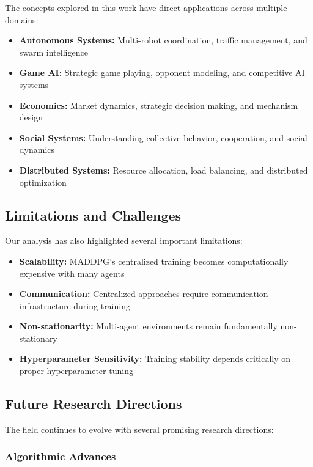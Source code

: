 \documentclass[conference]{IEEEtran}
\begin{document}
{{The concepts explored in this work have direct applications across multiple domains:

\begin{itemize}
    \item \textbf{Autonomous Systems:} Multi-robot coordination, traffic management, and swarm intelligence
    \item \textbf{Game AI:} Strategic game playing, opponent modeling, and competitive AI systems
    \item \textbf{Economics:} Market dynamics, strategic decision making, and mechanism design
    \item \textbf{Social Systems:} Understanding collective behavior, cooperation, and social dynamics
    \item \textbf{Distributed Systems:} Resource allocation, load balancing, and distributed optimization
\end{itemize}

\subsection{Limitations and Challenges}

Our analysis has also highlighted several important limitations:

\begin{itemize}
    \item \textbf{Scalability:} MADDPG's centralized training becomes computationally expensive with many agents
    \item \textbf{Communication:} Centralized approaches require communication infrastructure during training
    \item \textbf{Non-stationarity:} Multi-agent environments remain fundamentally non-stationary
    \item \textbf{Hyperparameter Sensitivity:} Training stability depends critically on proper hyperparameter tuning
\end{itemize}

\subsection{Future Research Directions}

The field continues to evolve with several promising research directions:

\subsubsection{Algorithmic Advances}

}}
\end{document}
